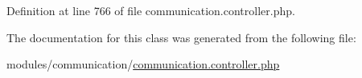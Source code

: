 Definition at line 766 of file communication.\+controller.\+php.



The documentation for this class was generated from the following file\+:\begin{DoxyCompactItemize}
\item 
modules/communication/\hyperlink{communication_8controller_8php}{communication.\+controller.\+php}\end{DoxyCompactItemize}

